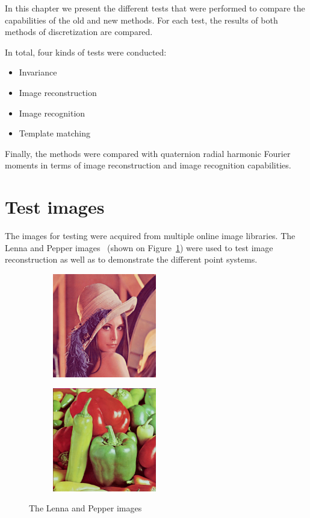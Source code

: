 In this chapter we present the different tests that were performed to compare the capabilities of the old and new methods. For each test, the results of both methods of discretization are compared.

In total, four kinds of tests were conducted:
\begin{itemize}
	\item Invariance
	\item Image reconstruction
	\item Image recognition
	\item Template matching
\end{itemize}

Finally, the methods were compared with quaternion radial harmonic Fourier moments in terms of image reconstruction and image recognition capabilities.

\section{Test images}\label{sec:test_images}
The images for testing were acquired from multiple online image libraries. The Lenna and Pepper images~\cite{usc_sipi} (shown on Figure~\ref{fig:lena_pepper_original}) were used to test image reconstruction as well as to demonstrate the different point systems.

\begin{figure}[tbp]
    \begin{subfigure}{0.49\textwidth}
        \centering
    \includegraphics[width=128pt]{figures/lenna_color_256.png}
    \caption{}
	\end{subfigure}
	\begin{subfigure}{0.49\textwidth}
        \centering
    \includegraphics[width=128pt]{figures/pepper_color_256.png}
    \caption{}
	\end{subfigure}
	\caption{The Lenna and Pepper images}
	\label{fig:lena_pepper_original}
\end{figure}

